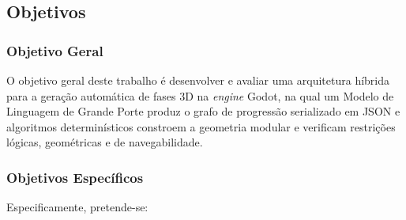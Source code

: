 \subsection{Objetivos}
\label{sec:objetivos}

\subsubsection{Objetivo Geral}
\label{sec:objetivo_geral}

O objetivo geral deste trabalho é desenvolver e avaliar uma arquitetura híbrida para a geração automática de fases 3D na \textit{engine} Godot, na qual um Modelo de Linguagem de Grande Porte produz o grafo de progressão serializado em JSON e algoritmos determinísticos constroem a geometria modular e verificam restrições lógicas, geométricas e de navegabilidade.

\subsubsection{Objetivos Específicos}
\label{sec:objetivos_especificos}

Especificamente, pretende-se:

